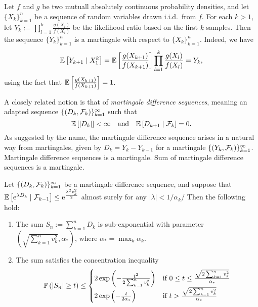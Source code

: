 \begin{example}
	Let \(f\) and \(g\) be two mutuall absolutely continuous probability densities, and let \(\{X_{k}\}_{k=1}^{n}\) be a sequence of random variables drawn i.i.d.\ from \(f\). For each \(k>1\), let \(Y_{k}:=\prod_{l=1}^{k}\frac{g(X_{l})}{f(X_{l})}\) be the likelihood ratio based on the first \(k\) samples. Then the sequence \(\{Y_{k}\}_{k=1}^{n}\) is a martingale with respect to \(\{X_{k}\}_{k=1}^{n}\). Indeed, we have
	\begin{equation*}
		\mathbb{E}\left[Y_{k+1}\mid X_{1}^{k}\right]=\mathbb{E}\left[\frac{g(X_{k+1})}{f(X_{k+1})}\right]\prod_{l=1}^{k}\frac{g(X_{l})}{f(X_{l})}=Y_{k},
	\end{equation*}
	using the fact that \(\mathbb{E}\left[\frac{g(X_{k+1})}{f(X_{k+1})}\right]=1\).
\end{example}

A closely related notion is that of \textit{martingale difference sequences}, meaning an adapted sequence \(\{(D_{k},\mathcal{F}_{k})\}_{k=1}^{\infty}\) such that
\begin{equation*}
	\mathbb{E}\left[\left|D_{k}\right|\right]<\infty\quad\text{and}\quad\mathbb{E}\left[D_{k+1}\mid\mathcal{F}_{k}\right]=0.
\end{equation*}
As suggested by the name, the martingale difference sequence arises in a natural way from martingales, given by \(D_{k}=Y_{k}-Y_{k-1}\) for a martingale \(\{(Y_{k},\mathcal{F}_{k})\}_{k=1}^{\infty}\).
Martingale difference sequences is a martingale.
Sum of martingale difference sequences is a martingale.

\begin{theorem}
	Let \(\{(D_{k},\mathcal{F}_{k})\}_{k=1}^{\infty}\) be a martingale difference sequence, and suppose that \(\mathbb{E}\left[\mathrm{e}^{\lambda D_{k}}\mid \mathcal{F}_{k-1}\right]\leq\mathrm{e}^{\frac{\lambda^{2}v_{k}^{2}}{2}}\) almost surely for any \(|\lambda|<1/\alpha_{k}\)/ Then the following hold:
	\begin{enumerate}
		\item The sum \(S_{n}:=\sum_{k=1}^{n}D_{k}\) is sub-exponential with parameter \(\left(\sqrt{\sum_{k=1}^{n}v_{k}^{2}},\alpha_{*}\right)\), where \(\alpha_{*}=\max_{k}\alpha_{k}\).
		\item The sum satisfies the concentration inequality
		      \begin{equation*}
			      \mathbb{P}\left(\left|S_{n}\right|\geq t\right)\leq\begin{cases}
				      2\exp\left(-\frac{t^{2}}{2\sum_{k=1}^{n}v_{k}^{2}}\right) & \text{if }0\leq t\leq\frac{\sqrt{2\sum_{k=1}^{n}v_{k}^{2}}}{\alpha_{*}} \\
				      2\exp\left(-\frac{t}{2\alpha_{*}}\right)                  & \text{if }t>\frac{\sqrt{2\sum_{k=1}^{n}v_{k}^{2}}}{\alpha_{*}}
			      \end{cases}
		      \end{equation*}
	\end{enumerate}
\end{theorem}


